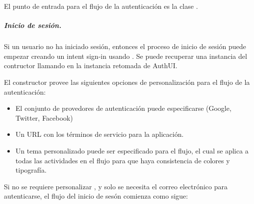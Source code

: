 El punto de entrada para el flujo de la autenticación es la clase
.


\subparagraph{Inicio de sesión.}
\label{\detokenize{dev_docs:inicio-de-sesion}}
Si un usuario no ha iniciado sesión, entonces el proceso de inicio de sesión
puede empezar creando un intent sign-in usando .
Se puede recuperar una instancia del contructor llamando
 en la instancia retomada de AuthUI.

El constructor provee las siguientes opciones de personalización para el flujo
de la autenticación:
\begin{itemize}
\item {} 
El conjunto de provedores de autenticación puede especificarse (Google, Twitter, Facebook)

\item {} 
Un URL con los términos de servicio para la aplicación.

\item {} 
Un tema personalizado puede ser especificado para el flujo, el cual se aplica a todas las actividades en el flujo para que haya consistencia de colores y tipografía.

\end{itemize}

Si no se requiere personalizar , y solo se necesita el correo electrónico para
autenticarse, el flujo del inicio de sesón comienza como sigue:

%
\begin{sphinxVerbatim}[commandchars=\\\{\}]
      


\end{sphinxVerbatim}

